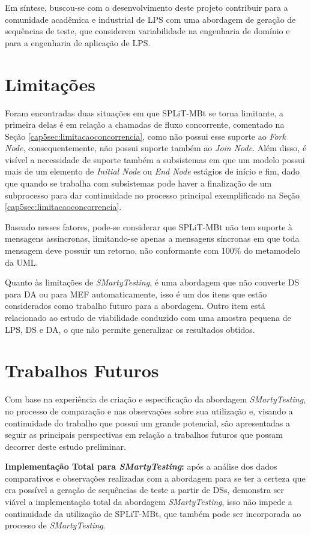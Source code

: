 Em síntese, buscou-se com o desenvolvimento deste projeto contribuir para a comunidade acadêmica e industrial de LPS com uma abordagem de geração de sequências de teste, que considerem variabilidade na engenharia de domínio e para a engenharia de aplicação de LPS. 

\section{Limitações}
Foram encontradas duas situações em que SPLiT-MBt se torna limitante, a primeira delas é em relação a chamadas de fluxo concorrente, comentado na Seção \ref{cap5sec:limitacaoconcorrencia}, como não possui esse suporte ao \textit{Fork Node}, consequentemente, não possui suporte também ao \textit{Join Node}. Além disso, é visível a necessidade de suporte também a subsistemas em que um modelo possui mais de um elemento de \textit{Initial Node} ou \textit{End Node} estágios de início e fim, dado que quando se trabalha com subsistemas pode haver a finalização de um subprocesso para dar continuidade no processo principal exemplificado na Seção \ref{cap5sec:limitacaoconcorrencia}.

Baseado nesses fatores, pode-se considerar que SPLiT-MBt não tem suporte à mensagens assíncronas, limitando-se apenas a mensagens síncronas em que toda mensagem deve possuir um retorno, não conformante com 100\% do metamodelo da UML.

Quanto às limitações de \textit{SMartyTesting}, é uma abordagem que não converte DS para DA ou para MEF automaticamente, isso é um dos itens que estão considerados como trabalho futuro para a abordagem. Outro item está relacionado ao estudo de viabilidade conduzido com uma amostra pequena de LPS, DS e DA, o que não permite generalizar os resultados obtidos.

\section{Trabalhos Futuros}

Com base na experiência de criação e especificação da abordagem \textit{SMartyTesting}, no processo de comparação e nas observações sobre sua utilização e, visando a continuidade do trabalho que possui um grande potencial, são apresentadas a seguir as principais perspectivas em relação a trabalhos futuros que possam decorrer deste estudo preliminar.

\textbf{Implementação Total para \textit{SMartyTesting}:} após a análise dos dados comparativos e observações realizadas com a abordagem para se ter a certeza que era possível a geração de sequências de teste a partir de DSs, demonstra ser viável a implementação total da abordagem \textit{SMartyTesting}, isso não impede a continuidade da utilização de SPLiT-MBt, que também pode ser incorporada ao processo de \textit{SMartyTesting}.

